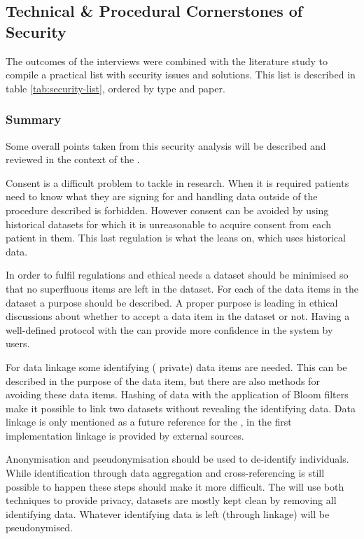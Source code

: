 \subsection{Technical \& Procedural Cornerstones of Security}
\label{security-summarisation}

The outcomes of the interviews were combined with the literature study to compile a practical list with security issues and solutions.
This list is described in table \ref{tab:security-list}, ordered by type and paper.



\subsubsection{Summary}
\label{security-summarisation-subsub}

Some overall points taken from this security analysis will be described and reviewed in the context of the \ivfsystem{}.

Consent is a difficult problem to tackle in research.
When it is required patients need to know what they are signing for and handling data outside of the procedure described is forbidden.
However consent can be avoided by using historical datasets for which it is unreasonable to acquire consent from each patient in them.
This last regulation is what the \ivfsystem{} leans on, which uses historical data.

In order to fulfil regulations and ethical needs a dataset should be minimised so that no superfluous items are left in the dataset.
For each of the data items in the dataset a purpose should be described. 
A proper purpose is leading in ethical discussions about whether to accept a data item in the dataset or not.
Having a well-defined protocol with the \ivfsystem{} can provide more confidence in the system by users.

For data linkage some identifying (\ie{} private) data items are needed.
This can be described in the purpose of the data item, but there are also methods for avoiding these data items.
Hashing of data with the application of Bloom filters make it possible to link two datasets without revealing the identifying data.
Data linkage is only mentioned as a future reference for the \ivfsystem{}, in the first implementation linkage is provided by external sources.

Anonymisation and pseudonymisation should be used to de-identify individuals.
While identification through data aggregation and cross-referencing is still possible to happen these steps should make it more difficult.
The \ivfsystem{} will use both techniques to provide privacy, datasets are mostly kept clean by removing all identifying data.
Whatever identifying data is left (through linkage) will be pseudonymised.

